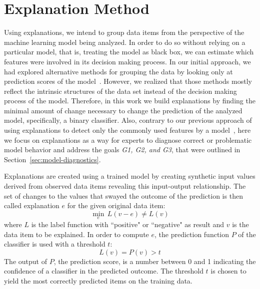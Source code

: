 \section{Explanation Method}
\label{sec:algo}


Using explanations, we intend to group data items from the perspective of the machine learning model being analyzed.
In order to do so without relying on a particular model, that is, treating the model as black box, we can estimate which features were involved in its decision making process.
In our initial approach, we had explored alternative methods for grouping the data by looking only at prediction scores of the model~\cite{class_signatures}. However, we realized that those methods mostly reflect the intrinsic structures of the data set instead of the decision making process of the model. Therefore, in this work we build explanations by finding the minimal amount of change necessary to change the prediction of the analyzed model, specifically, a binary classifier. Also, contrary to our previous approach of using explanations to detect only the commonly used features by a model~\cite{rivelo}, here we focus on explanations as a way for experts to diagnose correct or problematic model behavior and address the goals \emph{G1, G2, and G3}, that were outlined in Section~\ref{sec:model-diagnostics}.


Explanations are created using a trained model by creating synthetic input values derived from observed data items revealing this input-output relationship.
The set of changes to the values that swayed the outcome of the prediction is then called explanation $e$ for the given original data item:
%
\[
\min_{e} \, L(v - e) \neq L(v)
\]
%
where $L$ is the label function with ``positive" or ``negative" as result and $v$ is the data item to be explained.
In order to compute $e$, the prediction function $P$ of the classifier is used with a threshold $t$:
%
\[
L(v) = P(v) > t
\]
%
The output of $P$, the prediction score, is a number between 0 and 1 indicating the confidence of a classifier in the predicted outcome.
The threshold $t$ is chosen to yield the most correctly predicted items on the training data.

